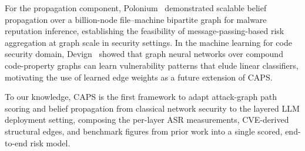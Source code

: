 For the propagation component, Polonium~\cite{chau2011polonium} demonstrated
scalable belief propagation over a billion-node file--machine bipartite graph
for malware reputation inference, establishing the feasibility of
message-passing-based risk aggregation at graph scale in security settings.
In the machine learning for code security domain, Devign~\cite{zhou2019devign}
showed that graph neural networks over compound code-property graphs can learn
vulnerability patterns that elude linear classifiers, motivating the use of
learned edge weights as a future extension of CAPS.


To our knowledge, CAPS is the first framework to adapt attack-graph path
scoring and belief propagation from classical network security to the layered
LLM deployment setting, composing the per-layer ASR measurements, CVE-derived
structural edges, and benchmark figures from prior work into a single scored,
end-to-end risk model.
